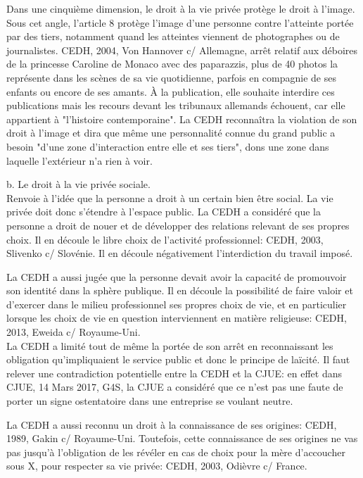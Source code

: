 \documentclass[10pt, a4paper, openany]{book}
\begin{document}
Dans une cinquième dimension, le droit à la vie privée protège le droit à l'image. Sous cet angle, l'article 8 protège l'image d'une personne contre l'atteinte portée par des tiers, notamment quand les atteintes viennent de photographes ou de journalistes. CEDH, 2004, Von Hannover c/ Allemagne, arrêt relatif aux déboires de la princesse Caroline de Monaco avec des paparazzis, plus de 40 photos la représente dans les scènes de sa vie quotidienne, parfois en compagnie de ses enfants ou encore de ses amants. À la publication, elle souhaite interdire ces publications mais les recours devant les tribunaux allemands échouent, car elle appartient à "l'histoire contemporaine". La CEDH reconnaîtra la violation de son droit à l'image et dira que même une personnalité connue du grand public a besoin "d'une zone d'interaction entre elle et ses tiers", dons une zone dans laquelle l'extérieur n'a rien à voir. 


b. Le droit à la vie privée sociale. \\
Renvoie à l'idée que la personne a droit à un certain bien être social. La vie privée doit donc s'étendre à l'espace public. La CEDH a considéré que la personne a droit de nouer et de développer des relations relevant de ses propres choix. Il en découle le libre choix de l'activité professionnel: CEDH, 2003, Slivenko c/ Slovénie. Il en découle négativement l'interdiction du travail imposé.


La CEDH a aussi jugée que la personne devait avoir la capacité de promouvoir son identité dans la sphère publique. Il en découle la possibilité de faire valoir et d'exercer dans le milieu professionnel ses propres choix de vie, et en particulier lorsque les choix de vie en question interviennent en matière religieuse: CEDH, 2013, Eweida c/ Royaume-Uni. \\
La CEDH a limité tout de même la portée de son arrêt en reconnaissant les obligation qu'impliquaient le service public et donc le principe de laïcité. Il faut relever une contradiction potentielle entre la CEDH et la CJUE: en effet dans CJUE, 14 Mars 2017, G4S, la CJUE a considéré que ce n'est pas une faute de porter un signe ostentatoire dans une entreprise se voulant neutre. 


La CEDH a aussi reconnu un droit à la connaissance de ses origines: CEDH, 1989, Gakin c/ Royaume-Uni. Toutefois, cette connaissance de ses origines ne vas pas jusqu'à l'obligation de les révéler en cas de choix pour la mère d'accoucher sous X, pour respecter sa vie privée: CEDH, 2003, Odièvre c/ France. 
\end{document}

